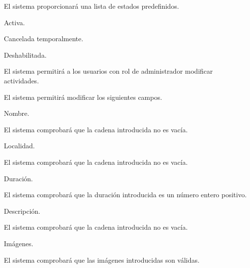 \begin{enumitem}[label=\bfseries{RAdm \arabic*.},leftmargin=*]
\begin{enumitem}[label*=\bfseries{\arabic*.}]
		\begin{enumitem}[label*=\bfseries{\arabic*.}]
			\item El sistema proporcionará una lista de estados predefinidos.
			\begin{enumitem}[label*=\bfseries{\arabic*.}]
				\item Activa.
				\item Cancelada temporalmente.
				\item Deshabilitada.
			\end{enumitem}
		\end{enumitem}
	\end{enumitem}
	\item El sistema permitirá a los usuarios con rol de administrador modificar actividades.
	\begin{enumitem}[label*=\bfseries{\arabic*.}]
		\item El sistema permitirá modificar los siguientes campos.
		\begin{enumitem}[label*=\bfseries{\arabic*.}]
			\item Nombre.
			\begin{enumitem}[label*=\bfseries{\arabic*.}]
				\item El sistema comprobará que la cadena introducida no es vacía.
			\end{enumitem}
			\item Localidad.
			\begin{enumitem}[label*=\bfseries{\arabic*.}]
				\item El sistema comprobará que la cadena introducida no es vacía.
			\end{enumitem}
			\item Duración.
			\begin{enumitem}[label*=\bfseries{\arabic*.}]
				\item El sistema comprobará que la duración introducida es un número entero positivo.
			\end{enumitem}
			\item Descripción.
			\begin{enumitem}[label*=\bfseries{\arabic*.}]
				\item El sistema comprobará que la cadena introducida no es vacía.
			\end{enumitem}
			\item Imágenes.
			\begin{enumitem}[label*=\bfseries{\arabic*.}]
				\item El sistema comprobará que las imágenes introducidas son válidas.

\end{enumitem}
\end{enumitem}
\end{enumitem}
\end{enumitem}
